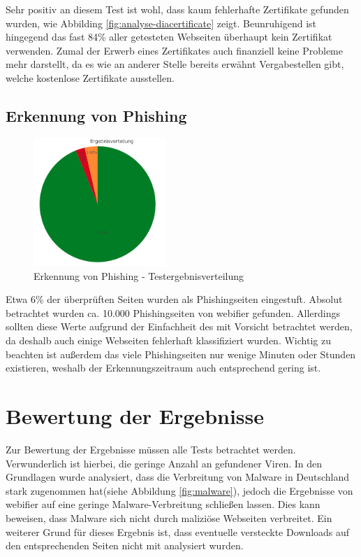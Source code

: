 Sehr positiv an diesem Test ist wohl, dass kaum fehlerhafte Zertifikate gefunden wurden, wie Abbilding \ref{fig:analyse-diacertificate} zeigt. Beunruhigend ist hingegend das fast 84\% aller getesteten Webseiten überhaupt kein Zertifikat verwenden. Zumal der Erwerb eines Zertifikates auch finanziell keine Probleme mehr darstellt, da es wie an anderer Stelle bereits erwähnt Vergabestellen gibt, welche kostenlose Zertifikate ausstellen.

\subsection{Erkennung von Phishing}
\begin{figure}[H]
  \centering
  \includegraphics[width=5cm]{images/stats/diaphishing}
  \caption{Erkennung von Phishing - Testergebnisverteilung}
  \label{fig:analyse-diaphishing}
\end{figure}

Etwa 6\% der überprüften Seiten wurden als Phishingseiten eingestuft. Absolut betrachtet wurden ca. 10.000 Phishingseiten von webifier gefunden. Allerdings sollten diese Werte aufgrund der Einfachheit des mit Vorsicht betrachtet werden, da deshalb auch einige Webseiten fehlerhaft klassifiziert wurden. Wichtig zu beachten ist außerdem das viele Phishingseiten nur wenige Minuten oder Stunden existieren, weshalb der Erkennungszeitraum auch entsprechend gering ist.

\section{Bewertung der Ergebnisse}
Zur Bewertung der Ergebnisse müssen alle Tests betrachtet werden. Verwunderlich ist hierbei, die geringe Anzahl an gefundener Viren. In den Grundlagen wurde analysiert, dass die Verbreitung von Malware in Deutschland stark zugenommen hat(siehe Abbildung \ref{fig:malware}), jedoch die Ergebnisse von webifier auf eine geringe Malware-Verbreitung schließen lassen. Dies kann beweisen, dass Malware sich nicht durch maliziöse Webseiten verbreitet. Ein weiterer Grund für dieses Ergebnis ist, dass eventuelle versteckte Downloads auf den entsprechenden Seiten nicht mit analysiert wurden.

